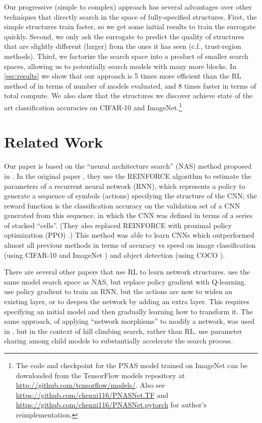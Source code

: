 \documentclass[runningheads]{llncs}
\newcommand{\NAS}{NAS}
\newcommand{\NAScell}{\NAS}
\begin{document}
Our progressive (simple to complex) approach has several advantages over other techniques that directly search in the space of fully-specified structures. First, the simple structures train faster, so we get some initial results to train the surrogate quickly. Second, we only ask the surrogate to predict the quality of structures that are slightly different
(larger) from the ones it has seen
(c.f., trust-region methods). 
Third, we factorize the search space into a product of smaller search spaces, 
allowing us to potentially search models with many more blocks.
In \cref{sec:results} we show that our approach 
is 5 times more efficient than the RL method of \cite{DBLP:journals/corr/ZophVSL17} in terms of number of models evaluated, and 8 times faster in terms of total compute.
We also show that the structures we discover achieve state of the art classification accuracies on CIFAR-10 and ImageNet.\footnote{The code and checkpoint for the PNAS model trained on ImageNet can be downloaded from the TensorFlow models repository at \url{http://github.com/tensorflow/models/}. Also see \url{https://github.com/chenxi116/PNASNet.TF} and \url{https://github.com/chenxi116/PNASNet.pytorch} for author's reimplementation.}

\section{Related Work}\label{sec:related}

Our paper is based on the ``neural architecture search'' (NAS) method proposed in
\cite{DBLP:journals/corr/ZophL16,DBLP:journals/corr/ZophVSL17}.
In the original paper  \cite{DBLP:journals/corr/ZophL16},
they
use the REINFORCE algorithm \cite{Williams92} to estimate the parameters of a
recurrent neural network (RNN),
which represents a policy to generate a sequence of symbols (actions) specifying the structure of the CNN; the reward function is the classification accuracy on the validation set of a CNN generated from this sequence.
in which the CNN was defined in terms of a series of stacked ``cells''.
(They also replaced  REINFORCE with 
proximal policy optimization (PPO) \cite{PPO}.)
This method was able to learn CNNs which outperformed almost all previous methods
in terms of accuracy vs speed on image classification (using
CIFAR-10 \cite{krizhevsky2009learning} and ImageNet \cite{DBLP:conf/cvpr/DengDSLL009})
and object detection (using COCO \cite{DBLP:conf/eccv/LinMBHPRDZ14}).

There are several other papers that use RL to learn network structures.
\cite{Zhong2018}  use the same model search space as \NAScell,  but replace policy gradient with Q-learning.
\cite{Cai2017} use policy gradient to train an RNN, but the actions are now to widen an existing layer, or to deepen the network by adding an extra layer. This requires specifying an initial model and then gradually learning how to transform it.
The same approach, of applying ``network morphisms'' to modify a network,
was used in 
\cite{Elsken2017}, but in the context of hill climbing search, rather than RL.
\cite{ENAS} use parameter sharing among child models to substantially accelerate the search process.
\end{document}
